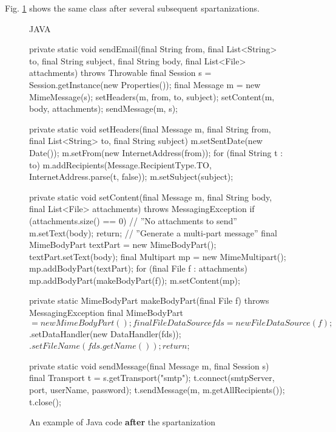 Fig. \ref{fig:code-after-spartanization} shows the same class after several
subsequent spartanizations. 

\begin{figure}
\begin{code}{JAVA}

private static void sendEmail(final String from, final List<String> to, 
                                  final String subject, final String body,
    final List<File> attachments) throws Throwable {
    final Session s = Session.getInstance(new Properties());
    final Message m = new MimeMessage(s);
    setHeaders(m, from, to, subject);
    setContent(m, body, attachments);
    sendMessage(m, s);
}

private static void setHeaders(final Message m, final String from, 
                                 final List<String> to, final String subject) {
    m.setSentDate(new Date());
    m.setFrom(new InternetAddress(from));
    for (final String t : to)
    m.addRecipients(Message.RecipientType.TO, InternetAddress.parse(t, false));
    m.setSubject(subject);
}

private static void setContent(final Message m, final String body, 
                      final List<File> attachments) throws MessagingException {
    if (attachments.size() == 0) { // ''No attachments to send''
    m.setText(body);
    return;
    }
    // ''Generate a multi-part message''
    final MimeBodyPart textPart = new MimeBodyPart();
    textPart.setText(body);
    final Multipart mp = new MimeMultipart();
    mp.addBodyPart(textPart);
    for (final File f : attachments)
    mp.addBodyPart(makeBodyPart(f));
    m.setContent(mp);
}

private static MimeBodyPart makeBodyPart(final File f) throws MessagingException {
    final MimeBodyPart $ = new MimeBodyPart();
    final FileDataSource fds = new FileDataSource(f);
    $.setDataHandler(new DataHandler(fds));
    $.setFileName(fds.getName());
    return $;
}

private static void sendMessage(final Message m, final Session s) {
    final Transport t = s.getTransport("smtp");
    t.connect(smtpServer, port, userName, password);
    t.sendMessage(m, m.getAllRecipients());
    t.close();
}

\end{code}
\caption{An example of Java code \textbf{after} the spartanization}
\label{fig:code-after-spartanization}
\end{figure}

